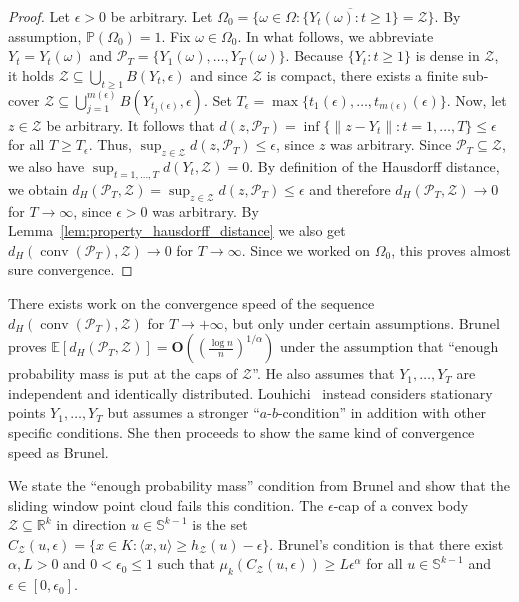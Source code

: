 \begin{proof}
    Let $\epsilon>0$ be arbitrary. Let $\Omega_0=\{\omega\in\Omega:\overline{\{Y_t(\omega):t\ge1\}}=\mathcal{Z}\}$. By assumption, $\mathbb{P}(\Omega_0)=1$. Fix $\omega\in\Omega_0$. In what follows, we abbreviate $Y_t=Y_t(\omega)$ and $\mathcal{P}_T=\{Y_1(\omega),\dots,Y_T(\omega)\}$. Because $\{Y_t:t\ge1\}$ is dense in $\mathcal{Z}$, it holds $\mathcal{Z}\subseteq\bigcup_{t\ge1}B(Y_t,\epsilon)$ and since $\mathcal{Z}$ is compact, there exists a finite sub-cover $\mathcal{Z}\subseteq\bigcup_{j=1}^{m(\epsilon)}B(Y_{t_j(\epsilon)},\epsilon)$. Set $T_{\epsilon}=\max\{t_1(\epsilon),\dots,t_{m(\epsilon)}(\epsilon)\}$. Now, let $z\in\mathcal{Z}$ be arbitrary. It follows that $d(z,\mathcal{P}_T)=\inf\{\|z-Y_t\|:t=1,\dots,T\}\le\epsilon$ for all $T\ge T_{\epsilon}$. Thus, $\sup_{z\in\mathcal{Z}}d(z,\mathcal{P}_T)\le\epsilon$, since $z$ was arbitrary. Since $\mathcal{P}_T\subseteq\mathcal{Z}$, we also have $\sup_{t=1,\dots,T}d(Y_t,\mathcal{Z})=0$. By definition of the Hausdorff distance, we obtain $d_H(\mathcal{P}_T,\mathcal{Z})=\sup_{z\in\mathcal{Z}}d(z,\mathcal{P}_T)\le\epsilon$ and therefore $d_H(\mathcal{P}_T,\mathcal{Z})\to0$ for $T\to\infty$, since $\epsilon>0$ was arbitrary. By Lemma~\ref{lem:property_hausdorff_distance} we also get $d_H(\operatorname{conv}(\mathcal{P}_T),\mathcal{Z})\to0$ for $T\to\infty$. Since we worked on $\Omega_0$, this proves almost sure convergence.
\end{proof}

There exists work on the convergence speed of the sequence $d_H(\operatorname{conv}(\mathcal{P}_T),\mathcal{Z})$ for $T\to+\infty$, but only under certain assumptions. Brunel~\cite{brunel_uniform_2019} proves $\mathbb{E}[d_H(\mathcal{P}_T,\mathcal{Z})]=\mathbf{O}((\frac{\log{n}}{n})^{1/\alpha})$ under the assumption that \enquote{enough probability mass is put at the caps of $\mathcal{Z}$}. He also assumes that $Y_1,\dots,Y_T$ are independent and identically distributed. Louhichi~\cite{louhichi_sharp_2025} instead considers stationary points $Y_1,\dots,Y_T$ but assumes a stronger \enquote{$a$-$b$-condition} in addition with other specific conditions. She then proceeds to show the same kind of convergence speed as Brunel.

We state the \enquote{enough probability mass} condition from Brunel and show that the sliding window point cloud fails this condition. The $\epsilon$-cap of a convex body $\mathcal{Z}\subseteq\mathbb{R}^k$ in direction $u\in\mathbb{S}^{k-1}$ is the set $C_{\mathcal{Z}}(u,\epsilon)=\{x\in K:\langle x,u\rangle\ge h_{\mathcal{Z}}(u)-\epsilon\}$. Brunel's condition is that there exist $\alpha,L>0$ and $0<\epsilon_0\le1$ such that $\mu_k(C_{\mathcal{Z}}(u,\epsilon))\ge L\epsilon^{\alpha}$ for all $u\in\mathbb{S}^{k-1}$ and $\epsilon\in[0,\epsilon_0]$.


